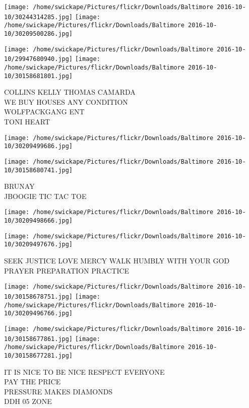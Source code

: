 \documentclass[10pt,letterpaper]{article}
\begin{document}
\texttt{[image: /home/swickape/Pictures/flickr/Downloads/Baltimore 2016-10-10/30244314285.jpg]}
\texttt{[image: /home/swickape/Pictures/flickr/Downloads/Baltimore 2016-10-10/30209500286.jpg]}

\texttt{[image: /home/swickape/Pictures/flickr/Downloads/Baltimore 2016-10-10/29947680940.jpg]}
\texttt{[image: /home/swickape/Pictures/flickr/Downloads/Baltimore 2016-10-10/30158681801.jpg]}

COLLINS KELLY THOMAS CAMARDA\\
WE BUY HOUSES ANY CONDITION\\
WOLFPACKGANG ENT\\
TONI HEART\\
\pagebreak

\texttt{[image: /home/swickape/Pictures/flickr/Downloads/Baltimore 2016-10-10/30209499686.jpg]}

\vspace{0.25in}
\texttt{[image: /home/swickape/Pictures/flickr/Downloads/Baltimore 2016-10-10/30158680741.jpg]}

BRUNAY\\
JBOOGIE TIC TAC TOE\\
\pagebreak

\texttt{[image: /home/swickape/Pictures/flickr/Downloads/Baltimore 2016-10-10/30209498666.jpg]}

\vspace{0.25in}
\texttt{[image: /home/swickape/Pictures/flickr/Downloads/Baltimore 2016-10-10/30209497676.jpg]}

SEEK JUSTICE LOVE MERCY WALK HUMBLY WITH YOUR GOD\\
PRAYER PREPARATION PRACTICE\\
\pagebreak

\texttt{[image: /home/swickape/Pictures/flickr/Downloads/Baltimore 2016-10-10/30158678751.jpg]}
\texttt{[image: /home/swickape/Pictures/flickr/Downloads/Baltimore 2016-10-10/30209496766.jpg]}

\texttt{[image: /home/swickape/Pictures/flickr/Downloads/Baltimore 2016-10-10/30158677861.jpg]}
\texttt{[image: /home/swickape/Pictures/flickr/Downloads/Baltimore 2016-10-10/30158677281.jpg]}

IT IS NICE TO BE NICE RESPECT EVERYONE\\
PAY THE PRICE\\
PRESSURE MAKES DIAMONDS\\
DDH 05 ZONE\\
\pagebreak
\end{document}
